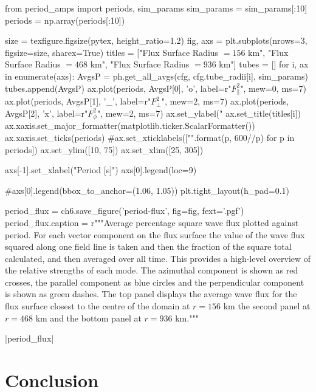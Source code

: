 \begin{pycode}[chapter6]
from period_amps import periods, sim_params
sim_params = sim_params[:10]
periods = np.array(periods[:10])

size = texfigure.figsize(pytex, height_ratio=1.2)
fig, axs = plt.subplots(nrows=3, figsize=size, sharex=True)
titles = ["Flux Surface Radius $=156$ km", "Flux Surface Radius $=468$ km", "Flux Surface Radius $=936$ km"]
tubes = []
for i, ax in enumerate(axs):
    AvgsP = ph.get_all_avgs(cfg, cfg.tube_radii[i], sim_params)
    tubes.append(AvgsP)
    ax.plot(periods, AvgsP[0], 'o', label=r"$F_\parallel^2$", mew=0, ms=7)
    ax.plot(periods, AvgsP[1], '_', label=r"$F_\perp^2$", mew=2, ms=7)
    ax.plot(periods, AvgsP[2], 'x', label=r"$F_\phi^2$", mew=2, ms=7)
    ax.set_ylabel("%
    ax.set_title(titles[i])
    ax.xaxis.set_major_formatter(matplotlib.ticker.ScalarFormatter())
    ax.xaxis.set_ticks(periods)
    #ax.set_xticklabels(["{}".format(p, 600//p) for p in periods])
    ax.set_ylim([10, 75])
    ax.set_xlim([25, 305])

axs[-1].set_xlabel("Period [s]")
axs[0].legend(loc=9)

#axs[0].legend(bbox_to_anchor=(1.06, 1.05))
plt.tight_layout(h_pad=0.1)

period_flux = ch6.save_figure('period-flux', fig=fig, fext='.pgf')
period_flux.caption = r"""Average percentage square wave flux plotted against period. For each vector component on the flux surface the value of the wave flux squared along one field line is taken and then the fraction of the square total calculated, and then averaged over all time. This provides a high-level overview of the relative strengths of each mode. The azimuthal component is shown as red crosses, the parallel component as blue circles and the perpendicular component is shown as green dashes. The top panel displays the average wave flux for the flux surface closest to the centre of the domain at $r=156$ km the second panel at $r=468$ km and the bottom panel at $r=936$ km."""

\end{pycode}

\py[chapter6]|period_flux|

\section{Conclusion}\label{sec:conclusion}

